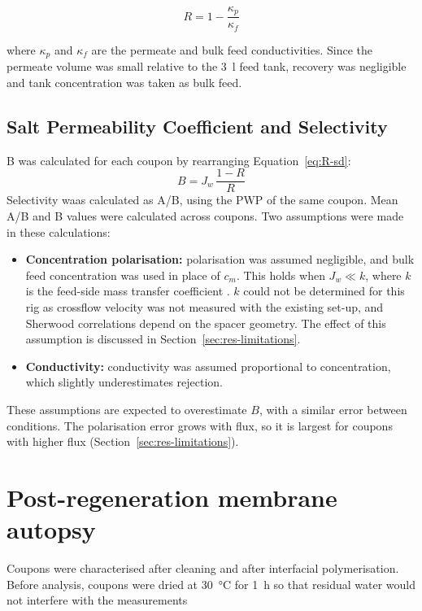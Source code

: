 \begin{equation}
  R = 1 - \frac{\kappa_p}{\kappa_f}
  \label{eq:rejection-methods}
\end{equation}

where $\kappa_p$ and $\kappa_f$ are the permeate and bulk feed conductivities. Since the permeate volume was small relative to the \qty{3}{\litre} feed tank, recovery was negligible and tank concentration was taken as bulk feed. 

\subsection{Salt Permeability Coefficient and Selectivity}
B was calculated for each coupon by rearranging Equation~\ref{eq:R-sd}:
\begin{equation}
  B = J_w\,\frac{1 - R}{R}
  \label{eq:b-methods}
\end{equation}
Selectivity waas calculated as A/B, using the PWP of the same coupon. Mean A/B and B values were calculated across coupons. Two assumptions were made in these calculations:

\begin{itemize}
  \item \textbf{Concentration polarisation:} polarisation was assumed negligible, and bulk feed concentration was used in place of $c_m$. This holds when $J_w \ll k$, where $k$ is the feed-side mass transfer coefficient \citep{Werber2016}. $k$ could not be determined for this rig as crossflow velocity was not measured with the existing set-up, and Sherwood correlations depend on the spacer geometry. The effect of this assumption is discussed in Section~\ref{sec:res-limitations}.
  \item \textbf{Conductivity:} conductivity was assumed proportional to concentration, which slightly underestimates rejection.
\end{itemize}
These assumptions are expected to overestimate $B$, with a similar error between conditions. The polarisation error grows with flux, so it is largest for coupons with higher flux (Section~\ref{sec:res-limitations}).


\section{Post-regeneration membrane autopsy}
\label{sec:autopsy}
Coupons were characterised after cleaning and after interfacial polymerisation. Before analysis, coupons were dried at \qty{30}{\degreeCelsius} for \qty{1}{\hour} so that residual water would not interfere with the measurements

